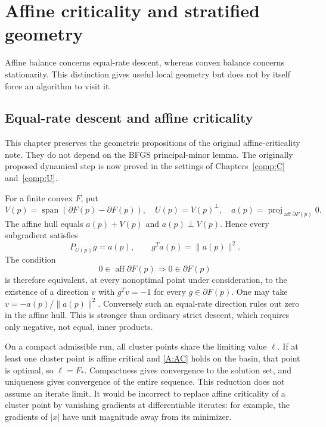 \chapter{Affine criticality and stratified geometry}\label{comp:A}\label{A:chapter}
\renewcommand{\ModuleTag}{8}
Affine balance concerns equal-rate descent, whereas convex balance concerns stationarity. This distinction gives useful local geometry but does not by itself force an algorithm to visit it.


\section{Equal-rate descent and affine criticality}

This chapter preserves the geometric propositions of the original affine-criticality note. They do not depend on the BFGS principal-minor lemma. The originally proposed dynamical step is now proved in the settings of Chapters~\ref{comp:C} and~\ref{comp:U}.

For a finite convex $F$, put
\[
 V(p)=\operatorname{span}(\partial F(p)-\partial F(p)),\quad U(p)=V(p)^\perp,
 \quad a(p)=\operatorname{proj}_{\operatorname{aff}\partial F(p)}0.
\]
The affine hull equals $a(p)+V(p)$ and $a(p)\perp V(p)$. Hence every subgradient satisfies
\[
 P_{U(p)}g=a(p),\qquad g^Ta(p)=\|a(p)\|^2.
\]
The condition
\begin{equation}\label{A:AC}
 0\in\operatorname{aff}\partial F(p)\Longrightarrow0\in\partial F(p)
\end{equation}
is therefore equivalent, at every nonoptimal point under consideration, to the existence of a direction $v$ with $g^Tv=-1$ for every $g\in\partial F(p)$. One may take $v=-a(p)/\|a(p)\|^2$. Conversely such an equal-rate direction rules out zero in the affine hull. This is stronger than ordinary strict descent, which requires only negative, not equal, inner products.

On a compact admissible run, all cluster points share the limiting value $\ell$. If at least one cluster point is affine critical and \eqref{A:AC} holds on the basin, that point is optimal, so $\ell=F_*$. Compactness gives convergence to the solution set, and uniqueness gives convergence of the entire sequence. This reduction does not assume an iterate limit. It would be incorrect to replace affine criticality of a cluster point by vanishing gradients at differentiable iterates: for example, the gradients of $|x|$ have unit magnitude away from its minimizer.

